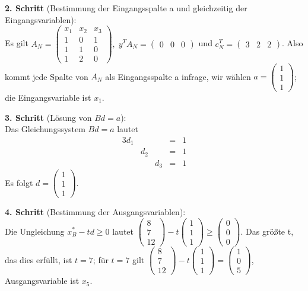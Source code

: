 \documentclass[10pt,a4paper,oneside,ngerman,numbers=noenddot]{scrartcl}
\begin{document}
		\textbf{2. Schritt} (Bestimmung der Eingangsspalte a und gleichzeitig der Eingangsvariablen):\\
		Es gilt $A_{N} = \begin{pmatrix} x_{1} & x_{2} & x_{3} \\ 1 & 0 & 1 \\ 1 & 1 & 0 \\ 1 & 2 & 0 \end{pmatrix},\; y^{T}A_{N} = \begin{pmatrix} 0 & 0 & 0 \end{pmatrix}$ und $c_{N}^{T} = \begin{pmatrix} 3 & 2 & 2 \end{pmatrix}$. Also kommt jede Spalte von $A_{N}$ als Eingangsspalte a infrage, wir wählen $a = \begin{pmatrix} 1 \\ 1 \\ 1 \end{pmatrix}$; die Eingangsvariable ist $x_{1}$.
		
		\textbf{3. Schritt} (Lösung von $Bd = a$):\\
		Das Gleichungssystem $Bd = a$ lautet
		\begin{alignat*}{3}
			d_{1} & & &=& 1 \\
			& d_{2} & &=& 1 \\
			& & d_{3} &=& 1
		\end{alignat*}
		Es folgt $d = \begin{pmatrix}1 \\ 1 \\ 1 \end{pmatrix}$.
		
		\textbf{4. Schritt} (Bestimmung der Ausgangsvariablen):\\
		Die Ungleichung $x_{B}^{*} - td \geq 0$ lautet $\begin{pmatrix} 8 \\ 7 \\ 12\end{pmatrix} - t \begin{pmatrix}1 \\ 1 \\ 1 \end{pmatrix} \geq \begin{pmatrix} 0 \\ 0 \\ 0 \end{pmatrix}$. Das größte t, das dies erfüllt, ist $t = 7$; für $t = 7$ gilt $\begin{pmatrix} 8 \\ 7 \\ 12\end{pmatrix} - t \begin{pmatrix}1 \\ 1 \\ 1 \end{pmatrix} = \begin{pmatrix} 1 \\ 0 \\ 5 \end{pmatrix}$, Ausgangsvariable ist $x_{5}$.
		
\end{document}
